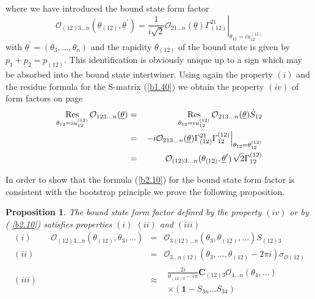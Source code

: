 \documentclass[a4paper,a4paper]{article}
\newtheorem{proposition}[theorem]{Proposition}
\begin{document}
where we have introduced the bound state form factor 
\begin{equation}
\mathcal{O}_{(12)3\dots n}(\theta _{(12)},\underline{\theta }^{\prime
})=\left. \frac{1}{i\sqrt{2}}\mathcal{O}_{21\dots n}(\underline{\theta }%
)\Gamma _{(12)}^{21}\right| _{\theta _{12}=iu_{12}^{(12)}}  \label{b2.10}
\end{equation}
with $\underline{\theta }^{\prime }=(\theta _{3},\dots ,\theta _{n})$ and
the rapidity $\theta _{(12)}$ of the bound state is given by $%
p_{1}+p_{2}=p_{(12)}$. This identification is obviously unique up to a sign
which may be absorbed into the bound state intertwiner. Using again the
property $(i)$ and the residue formula for the S-matrix (\ref{b1.40}) we
obtain the property $(iv)$ of form factors on page \pageref{pf} 
\begin{eqnarray*}
\mathop{\rm Res}_{\theta _{12}=iu_{12}^{(12)}}\mathcal{O}_{123\dots n}(%
\underline{\theta }) &=&\mathop{\rm Res}_{\theta _{12}=iu_{12}^{(12)}}%
\mathcal{O}_{213\dots n}(\underline{\theta })\dot{S}_{12} \\
&=&\left. -i\mathcal{O}_{213\dots n}(\underline{\theta })\Gamma
_{(12)}^{21}\Gamma _{12}^{(12)}\right| _{\theta _{12}=\theta _{12}^{(12)}} \\
&=&\mathcal{O}_{(12)3\dots n}(\theta _{(12)},\underline{\theta }^{\prime })\,%
\sqrt{2}\Gamma _{12}^{(12)}
\end{eqnarray*}

In order to show that the formula (\ref{b2.10}) for the bound state form
factor is consistent with the bootstrap principle we prove the following
proposition.

\begin{proposition}
\label{p1}The bound state form factor defined by the property $(iv)$ or by (%
\ref{b2.10}) satisfies properties $(i)$ $(ii)$ and $(iii)$ 
\[
\begin{array}{lllll}
(i) &  & \mathcal{O}_{(12)3\dots n}(\theta _{(12)},\theta _{3},\dots ) & = & 
\mathcal{O}_{3(12)\dots n}(\theta _{3},\theta _{(12)},\dots )S_{(12)3} \\%
[5pt] 
(ii) &  &  & = & \mathcal{O}_{3\dots n(12)}(\theta _{3},\dots ,\theta
_{(12)}-2\pi i)\sigma _{\mathcal{O}(12)} \\[5pt] 
(iii) &  &  & \approx & 
\begin{array}{r}
\frac{2i}{\theta _{(12)3}-i\pi }\mathbf{C}_{(12)3}\mathcal{O}_{4\dots
n}(\theta _{4},\dots ) \\ 
\times \left( \mathbf{1}-S_{3n}\dots S_{34}\right)
\end{array}
\end{array}
\]
\end{proposition}
\end{document}
